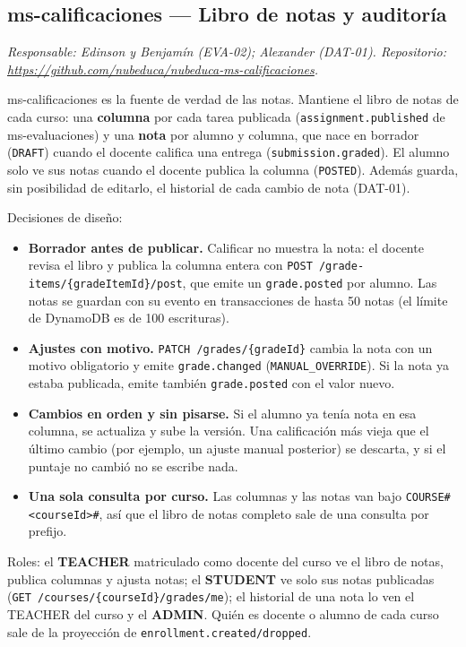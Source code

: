 \subsection{ms-calificaciones --- Libro de notas y auditoría}
\label{sec:ms-calificaciones}
\textit{Responsable: Edinson y Benjamín (EVA-02); Alexander (DAT-01). Repositorio: \url{https://github.com/nubeduca/nubeduca-ms-calificaciones}.}

ms-calificaciones es la fuente de verdad de las notas. Mantiene el libro de notas de cada curso: una
\textbf{columna} por cada tarea publicada (\texttt{assignment.published} de ms-evaluaciones) y una
\textbf{nota} por alumno y columna, que nace en borrador (\texttt{DRAFT}) cuando el docente califica una
entrega (\texttt{submission.graded}). El alumno solo ve sus notas cuando el docente publica la columna
(\texttt{POSTED}). Además guarda, sin posibilidad de editarlo, el historial de cada cambio de nota (DAT-01).

Decisiones de diseño:
\begin{itemize}
  \item \textbf{Borrador antes de publicar.} Calificar no muestra la nota: el docente revisa el libro y
        publica la columna entera con \texttt{POST /grade-items/\{gradeItemId\}/post}, que emite un
        \texttt{grade.posted} por alumno. Las notas se guardan con su evento en transacciones de hasta 50
        notas (el límite de DynamoDB es de 100 escrituras).
  \item \textbf{Ajustes con motivo.} \texttt{PATCH /grades/\{gradeId\}} cambia la nota con un motivo
        obligatorio y emite \texttt{grade.changed} (\texttt{MANUAL\_OVERRIDE}). Si la nota ya estaba
        publicada, emite también \texttt{grade.posted} con el valor nuevo.
  \item \textbf{Cambios en orden y sin pisarse.} Si el alumno ya tenía nota en esa columna, se actualiza y
        sube la versión. Una calificación más vieja que el último cambio (por ejemplo, un ajuste manual
        posterior) se descarta, y si el puntaje no cambió no se escribe nada.
  \item \textbf{Una sola consulta por curso.} Las columnas y las notas van bajo
        \texttt{COURSE\#<courseId>\#}, así que el libro de notas completo sale de una consulta por prefijo.
\end{itemize}

Roles: el \textbf{TEACHER} matriculado como docente del curso ve el libro de notas, publica columnas y
ajusta notas; el \textbf{STUDENT} ve solo sus notas publicadas (\texttt{GET /courses/\{courseId\}/grades/me});
el historial de una nota lo ven el TEACHER del curso y el \textbf{ADMIN}. Quién es docente o alumno de cada
curso sale de la proyección de \texttt{enrollment.created/dropped}.


